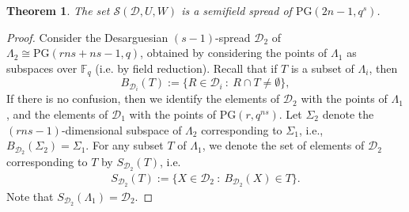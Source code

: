 \documentclass[12pt]{amsart}
\newtheorem{theorem}{\sc Theorem}[section]
\def\F{\mathbb{F}}
\def\PG{\mathrm{PG}}
\def\D{\mathcal{D}}
\begin{document}
\begin{theorem}\label{thm:main}
The set ${\mathcal S}(\D,U,W)$ is a semifield spread of $\PG(2n-1,q^s)$.
\end{theorem}
\begin{proof}
Consider the Desarguesian $(s-1)$-spread $\D_2$ of $\Lambda_2 \cong \PG(rns+ns-1,q)$, obtained by considering the points of $\Lambda_1$ as subspaces over $\F_q$ (i.e. by field reduction). Recall that if $T$ is a subset of $\Lambda_i$, then
$$
B_{\D_i}(T):=\{R\in \D_i ~:~ R\cap T \neq \emptyset\},
$$
If there is no confusion, then we identify the elements of $\D_2$ with the points of $\Lambda_1$, and the elements of $\D_1$ with the points of $\PG(r,q^{ns})$.
Let $\Sigma_2$ denote the $(rns-1)$-dimensional subspace of $\Lambda_2$ corresponding to $\Sigma_1$, i.e., $B_{\D_2}(\Sigma_2)=\Sigma_1$. For any subset $T$ of $\Lambda_1$, we denote the set of elements of $\D_2$ corresponding to $T$ by $S_{\D_2}(T)$, i.e.
\begin{eqnarray}
S_{\D_2}(T):=\{X\in \D_2 ~:~ B_{\D_2}(X) \in T\}.
\end{eqnarray}
Note that $S_{\D_2}(\Lambda_1)=\D_2$.


\end{proof}
\end{document}
